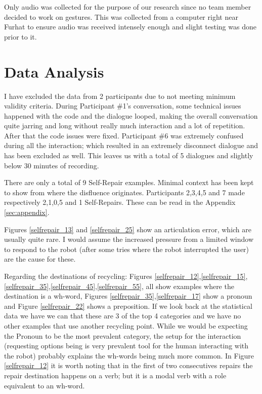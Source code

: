 \documentclass[11pt]{article}
\begin{document}
Only audio was collected for the purpose of our research since no team member decided to work on gestures. This was collected from a computer right near Furhat to ensure audio was received intensely enough and slight testing was done prior to it.


\section{Data Analysis}

I have excluded the data from 2 participants due to not meeting minimum validity criteria. During Participant \#1's conversation, some technical issues happened with the code and the dialogue looped, making the overall conversation quite jarring and long without really much interaction and a lot of repetition. After that the code issues were fixed. Participant \#6 was extremely confused during all the interaction; which resulted in an extremely disconnect dialogue and has been excluded as well. This leaves us with a total of 5 dialogues and slightly below 30 minutes of recording. 

There are only a total of 9 Self-Repair examples. Minimal context has been kept to show from where the disfluence originates. Participants 2,3,4,5 and 7 made respectively 2,1,0,5 and 1 Self-Repairs. These can be read in the Appendix \ref{sec:appendix}.

Figures \ref{selfrepair_13} and \ref{selfrepair_25} show an articulation error, which are usually quite rare. I would assume the increased pressure from a limited window to respond to the robot (after some tries where the robot interrupted the user) are the cause for these.

Regarding the destinations of recycling: Figures \ref{selfrepair_12},\ref{selfrepair_15},\ref{selfrepair_35},\ref{selfrepair_45},\ref{selfrepair_55}, all show examples where the destination is a wh-word, Figures \ref{selfrepair_35},\ref{selfrepair_17} show a pronoun and Figure \ref{selfrepair_22} shows a preposition. If we look back at the statistical data we have \cite{fox20102487} we can that these are 3 of the top 4 categories and we have no other examples that use another recycling point. While we would be expecting the Pronoun to be the most prevalent category, the setup for the interaction (requesting options being is very prevalent tool for the human interacting with the robot) probably explains the wh-words being much more common. In Figure \ref{selfrepair_12} it is worth noting that in the first of two consecutives repairs the repair destination happens on a verb; but it is a modal verb with a role equivalent to an wh-word.
\end{document}
